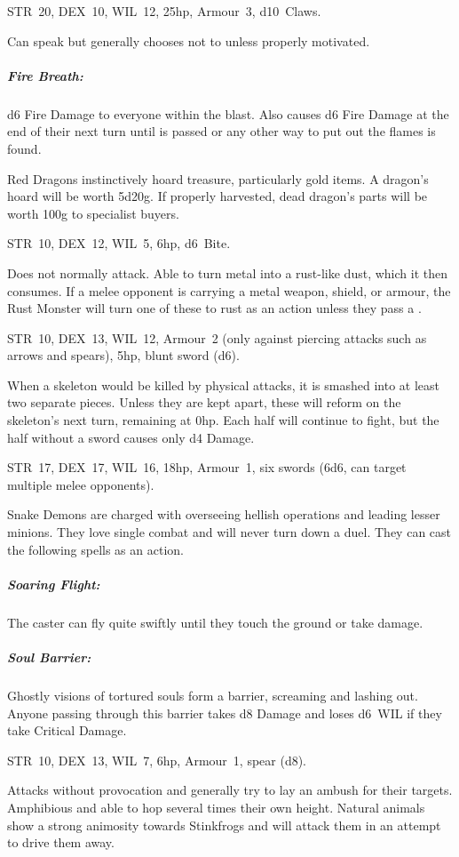 \documentclass[itdr]{subfiles}
\begin{document}
\break


STR~20, DEX~10, WIL~12, 25hp, Armour~3, d10~Claws.

Can speak but generally chooses not to unless properly motivated.

\subparagraph{Fire Breath:} d6 Fire Damage to everyone within the blast. Also causes d6 Fire Damage at the end of their next turn until  is passed or any other way to put out the flames is found.

Red Dragons instinctively hoard treasure, particularly gold items. A dragon's hoard will be worth 5d20g. If properly harvested, dead dragon's parts will be worth 100g to specialist buyers.


STR~10, DEX~12, WIL~5, 6hp, d6~Bite.

Does not normally attack. Able to turn metal into a rust-like dust, which it then consumes. If a melee opponent is carrying a metal weapon, shield, or armour, the Rust Monster will turn one of these to rust as an action unless they pass a .

STR~10, DEX~13, WIL~12, Armour~2 (only against piercing attacks such as arrows and spears), 5hp, blunt sword (d6).

When a skeleton would be killed by physical attacks, it is smashed into at least two separate pieces. Unless they are kept apart, these will reform on the skeleton's next turn, remaining at 0hp. Each half will continue to fight, but the half without a sword causes only d4 Damage.


\vfill
\break

\vspace{-1em}

STR~17, DEX~17, WIL~16, 18hp, Armour~1, six swords (6d6, can target multiple melee opponents).

Snake Demons are charged with overseeing hellish operations and leading lesser minions. They love single combat and will never turn down a duel. They can cast the following spells as an action.

\subparagraph{Soaring Flight:} The caster can fly quite swiftly until they touch the ground or take damage.

\subparagraph{Soul Barrier:} Ghostly visions of tortured souls form a barrier, screaming and lashing out. Anyone passing through this barrier takes d8 Damage and loses d6~WIL if they take Critical Damage.


STR~10, DEX~13, WIL~7, 6hp, Armour~1, spear (d8).

Attacks without provocation and generally try to lay an ambush for their targets. Amphibious and able to hop several times their own height. Natural animals show a strong animosity towards Stinkfrogs and will attack them in an attempt to drive them away.
\end{document}
